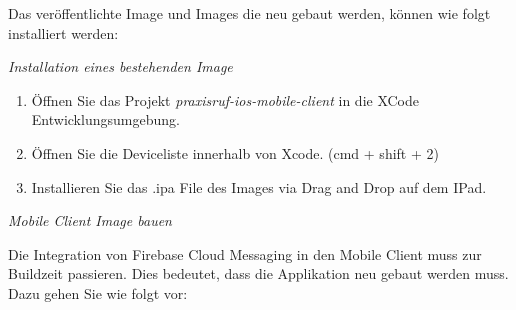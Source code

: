 Das veröffentlichte Image und Images die neu gebaut werden, können wie folgt installiert werden:

\textit{Installation eines bestehenden Image}

\begin{enumerate}
    \item Öffnen Sie das Projekt \textit{praxisruf-ios-mobile-client} in die XCode Entwicklungsumgebung.
    \item Öffnen Sie die Deviceliste innerhalb von Xcode. (cmd + shift + 2)
    \item Installieren Sie das .ipa File des Images via Drag and Drop auf dem IPad.
\end{enumerate}

\textit{Mobile Client Image bauen}

Die Integration von Firebase Cloud Messaging in den Mobile Client muss zur Buildzeit passieren.
Dies bedeutet, dass die Applikation neu gebaut werden muss.
Dazu gehen Sie wie folgt vor:

